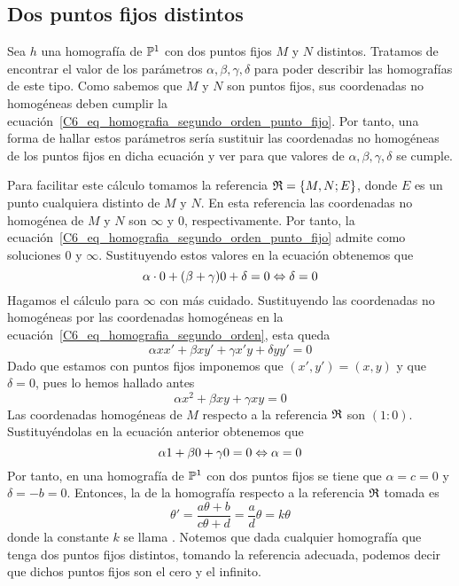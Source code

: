 \subsection{Dos puntos fijos distintos}
Sea $h$ una homografía de $\mathbb{P}^1$ con dos puntos fijos $M$ y $N$ distintos. Tratamos de encontrar el valor de los parámetros $\alpha, \beta,\gamma,\delta$ para poder describir las homografías de este tipo. Como sabemos que $M$ y $N$ son puntos fijos, sus coordenadas no homogéneas deben cumplir la ecuación~\eqref{C6_eq_homografia_segundo_orden_punto_fijo}. Por tanto, una forma de hallar estos parámetros sería sustituir las coordenadas no homogéneas de los puntos fijos en dicha ecuación y ver para que valores de $\alpha, \beta,\gamma,\delta$ se cumple. 

Para facilitar este cálculo tomamos la referencia $\mathfrak{R}=\{M,N;E\}$, donde $E$ es un punto cualquiera distinto de $M$ y $N$. En esta referencia las coordenadas no homogénea de $M$ y $N$ son $\infty$ y $0$, respectivamente. Por tanto, la ecuación~\eqref{C6_eq_homografia_segundo_orden_punto_fijo} admite como soluciones $0$ y $\infty$. Sustituyendo estos valores en la ecuación obtenemos que 
\begin{equation*}
	\alpha\cdot 0+(\beta+\gamma)0+\delta=0\Leftrightarrow\delta=0
\end{equation*}
Hagamos el cálculo para $\infty$ con más cuidado. Sustituyendo las coordenadas no homogéneas por las coordenadas homogéneas en la ecuación~\eqref{C6_eq_homografia_segundo_orden}, esta queda
\begin{equation}
	\alpha xx'+\beta xy'+\gamma x'y+\delta yy'=0
\end{equation}
Dado que estamos con puntos fijos imponemos que $(x',y')=(x,y)$ y que $\delta=0$, pues lo hemos hallado antes
\begin{equation*}
	\alpha x^2+\beta xy+\gamma xy=0
\end{equation*}
Las coordenadas homogéneas de $M$ respecto a la referencia $\mathfrak{R}$ son $(1:0)$. Sustituyéndolas en la ecuación anterior obtenemos que
\begin{equation*}
\alpha 1+\beta 0+\gamma 0=0\Leftrightarrow \alpha=0
\end{equation*}
Por tanto, en una homografía de $\mathbb{P}^1$ con dos puntos fijos se tiene que $\alpha=c=0$ y $\delta=-b=0$. Entonces, la  de la homografía respecto a la referencia $\mathfrak{R}$ tomada es
\begin{equation}
	\theta'=\frac{a\theta+b}{c\theta +d}=\frac{a}{d}\theta=k\theta
\end{equation}
donde la constante $k$ se llama . Notemos que dada cualquier homografía que tenga dos puntos fijos distintos, tomando la referencia adecuada, podemos decir que dichos puntos fijos son el cero y el infinito.


